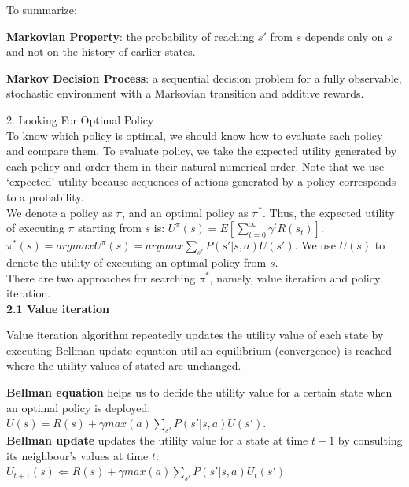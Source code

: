 \documentclass[12pt]{article}
\begin{document}
 To summarize: 
\begin{tcolorbox}
\textbf{Markovian Property}: the probability of reaching $s'$ from $s$ depends only on $s$ and not on the history of earlier states. 
\end{tcolorbox}

\begin{tcolorbox}
\textbf{Markov Decision Process}: a sequential decision problem for a fully observable, stochastic environment with a Markovian transition and additive rewards. 
\end{tcolorbox}

\pagebreak

\noindent
{\large{2. Looking For Optimal Policy}}\\

\noindent
To know which policy is optimal, we should know how to evaluate each policy and compare them. To evaluate policy, we take the expected utility generated by each policy and order them in their natural numerical order. Note that we use `expected' utility because sequences of actions generated by a policy corresponds to a probability. \\

\noindent
We denote a policy as $\pi$, and an optimal policy as $\pi^{*}$.  Thus, the expected utility of executing {$\pi$} starting from $s$ is: $U^{\pi}(s) = E[\sum_{t = 0}^{\infty} \gamma^t R(s_t) ]$. $\pi^{*}(s) = argmax U^{\pi}(s) = argmax \sum_{s'}^{} P(s' | s, a)U(s')$. We use $U(s)$ to denote the utility of executing an optimal policy from $s$.\\

There are two approaches for searching $\pi^{*}$, namely, value iteration and policy iteration.\\

\textbf{2.1 Value iteration}

Value iteration algorithm repeatedly updates the utility value of each state by executing Bellman update equation util an equilibrium (convergence) is reached where the utility values of stated are unchanged. \\

\begin{tcolorbox}

\textbf{Bellman equation} helps us to decide the utility value for a certain state when an optimal policy is deployed:\\
$U(s) = R(s) + \gamma max(a) \sum_{s'}^{} P(s' | s, a) U(s')$.\\

\textbf{Bellman update} updates the utility value for a state at time $t+1$ by consulting its neighbour's values at time $t$:\\
$U_{t+1} (s) \Leftarrow R(s) + \gamma max(a) \sum_{s'}^{} P(s' | s, a) U_t (s')$

\end{tcolorbox}
\end{document}
